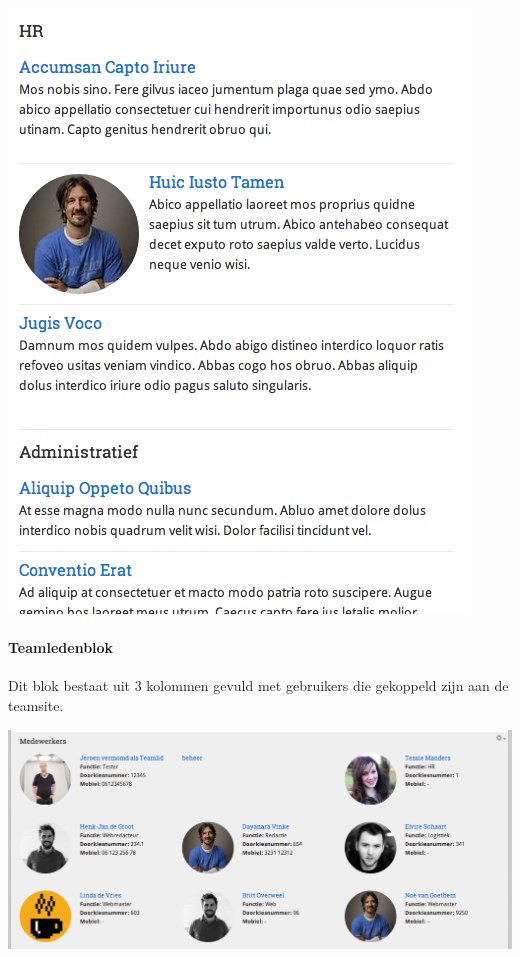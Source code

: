 \begin{center}
	\includegraphics[scale=0.5]{img/blokken/personeninternet.png}
\end{center}

\paragraph{Teamledenblok}

Dit blok bestaat uit 3 kolommen gevuld met gebruikers die gekoppeld zijn aan de teamsite.

\begin{center}
	\includegraphics[width=\textwidth]{img/blokken/personenintranet.png}
\end{center}

